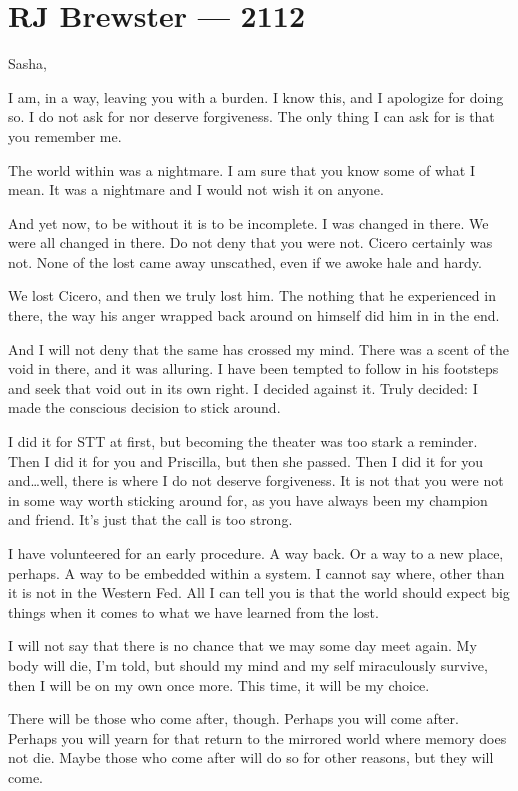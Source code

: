\hypertarget{rj-brewster-2112}{%
\chapter*{RJ Brewster — 2112}\label{rj-brewster-2112}}

Sasha,

I am, in a way, leaving you with a burden. I know this, and I apologize for doing so. I do not ask for nor deserve forgiveness. The only thing I can ask for is that you remember me.

The world within was a nightmare. I am sure that you know some of what I mean. It was a nightmare and I would not wish it on anyone.

And yet now, to be without it is to be incomplete. I was changed in there. We were all changed in there. Do not deny that you were not. Cicero certainly was not. None of the lost came away unscathed, even if we awoke hale and hardy.

We lost Cicero, and then we truly lost him. The nothing that he experienced in there, the way his anger wrapped back around on himself did him in in the end.

And I will not deny that the same has crossed my mind. There was a scent of the void in there, and it was alluring. I have been tempted to follow in his footsteps and seek that void out in its own right. I decided against it. Truly decided: I made the conscious decision to stick around.

I did it for STT at first, but becoming the theater was too stark a reminder. Then I did it for you and Priscilla, but then she passed. Then I did it for you and\ldots{}well, there is where I do not deserve forgiveness. It is not that you were not in some way worth sticking around for, as you have always been my champion and friend. It's just that the call is too strong.

I have volunteered for an early procedure. A way back. Or a way to a new place, perhaps. A way to be embedded within a system. I cannot say where, other than it is not in the Western Fed. All I can tell you is that the world should expect big things when it comes to what we have learned from the lost.

I will not say that there is no chance that we may some day meet again. My body will die, I'm told, but should my mind and my self miraculously survive, then I will be on my own once more. This time, it will be my choice.

There will be those who come after, though. Perhaps you will come after. Perhaps you will yearn for that return to the mirrored world where memory does not die. Maybe those who come after will do so for other reasons, but they will come.

